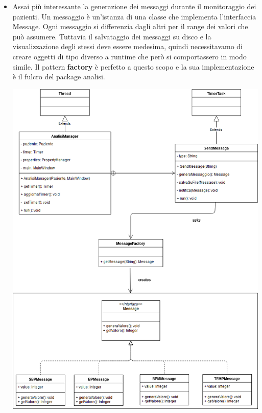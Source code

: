 \documentclass[a4paper]{report}
\begin{document}
\begin{itemize}
                \item Assai pi\`u interessante la generazione dei messaggi durante il monitoraggio dei pazienti. Un messaggio \`e un'istanza di una classe che implementa l'interfaccia Message. Ogni messaggio si differenzia dagli altri per il range dei valori che pu\`o assumere. Tuttavia il salvataggio dei messaggi su disco e la visualizzazione degli stessi deve essere medesima, quindi necessitavamo di creare oggetti di tipo diverso a runtime che per\`o si comportassero in modo simile. Il pattern \textbf{factory} \`e perfetto a questo scopo e la sua implementazione \`e il fulcro del package analisi.
                \begin{center}
                    \includegraphics[scale=0.5]{class/AnalisiPackage.png}
                \end{center}
                \begin{center}

\end{center}
\end{itemize}
\end{document}

